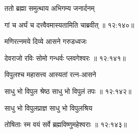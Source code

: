 {\devanagarifont ततो ब्रह्मा समुत्थाय अभिगम्य जनार्दनम् \thinspace{\dandab} \dontdisplaylinenum }%


{\devanagarifont गां च अर्घं च दत्त्वैवमास्यतामिति चाब्रवीत् {॥ १२:१४०॥} \veg\dontdisplaylinenum }%

{\devanagarifont मणिरत्नमये दिव्ये आसने गरुडध्वजः \thinspace{\dandab} \dontdisplaylinenum }%
 

{\devanagarifont देवराजो रविः सोमो गन्धर्वः प्लवगेश्वरः {॥ १२:१४१॥} \veg\dontdisplaylinenum }%

{\devanagarifont विपुलश्च महासत्त्व आस्यतां रत्न-आसने \thinspace{\dandab} \dontdisplaylinenum }%


{\devanagarifont साधु भो विपुल श्रेष्ठ साधु भो विपुलं तपः {॥ १२:१४२॥} \veg\dontdisplaylinenum }%

{\devanagarifont साधु भो विपुलप्राज्ञ साधु भो विपुलश्रिय \thinspace{\dandab} \dontdisplaylinenum }%


{\devanagarifont तोषिताः स्म वयं सर्वे ब्रह्मविष्णुमहेश्वराः {॥ १२:१४३॥} \veg\dontdisplaylinenum }%

